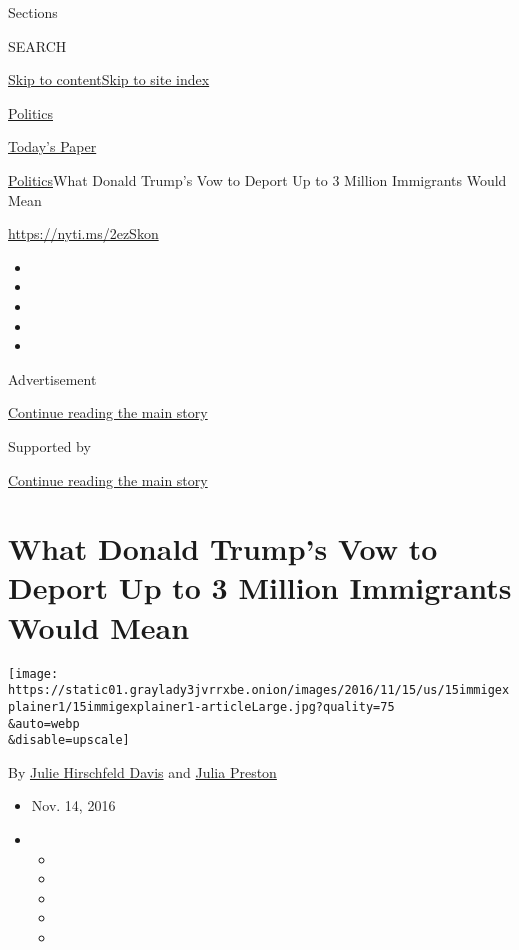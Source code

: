 Sections

SEARCH

\protect\hyperlink{site-content}{Skip to
content}\protect\hyperlink{site-index}{Skip to site index}

\href{https://www.nytimes3xbfgragh.onion/section/politics}{Politics}

\href{https://myaccount.nytimes3xbfgragh.onion/auth/login?response_type=cookie\&client_id=vi}{}

\href{https://www.nytimes3xbfgragh.onion/section/todayspaper}{Today's
Paper}

\href{/section/politics}{Politics}\textbar{}What Donald Trump's Vow to
Deport Up to 3 Million Immigrants Would Mean

\url{https://nyti.ms/2ezSkon}

\begin{itemize}
\item
\item
\item
\item
\item
\end{itemize}

Advertisement

\protect\hyperlink{after-top}{Continue reading the main story}

Supported by

\protect\hyperlink{after-sponsor}{Continue reading the main story}

\hypertarget{what-donald-trumps-vow-to-deport-up-to-3-million-immigrants-would-mean}{%
\section{What Donald Trump's Vow to Deport Up to 3 Million Immigrants
Would
Mean}\label{what-donald-trumps-vow-to-deport-up-to-3-million-immigrants-would-mean}}

\texttt{[image: https://static01.graylady3jvrrxbe.onion/images/2016/11/15/us/15immigexplainer1/15immigexplainer1-articleLarge.jpg?quality=75\\\&auto=webp\\\&disable=upscale]}

By
\href{https://www.nytimes3xbfgragh.onion/by/julie-hirschfeld-davis}{Julie
Hirschfeld Davis} and
\href{http://www.nytimes3xbfgragh.onion/by/julia-preston}{Julia Preston}

\begin{itemize}
\item
  Nov. 14, 2016
\item
  \begin{itemize}
  \item
  \item
  \item
  \item
  \item
  \end{itemize}
\end{itemize}

